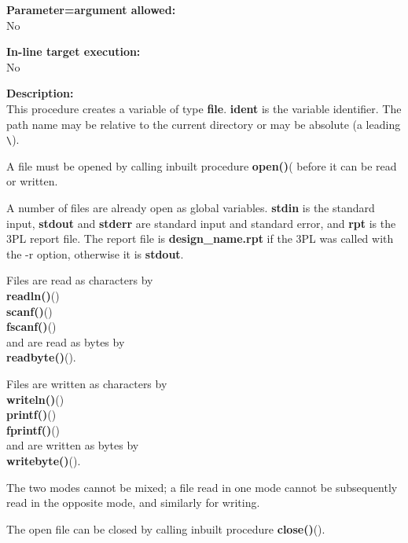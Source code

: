         {\bf Parameter=argument allowed:} \\
        No
        
        {\bf In-line target execution:} \\
        No
        
        {\bf Description:} \\
        This procedure creates a variable of type {\bf file}. {\bf ident} is
        the variable identifier. The path name may be relative to the current
        directory or may be absolute (a leading \verb'\').
        
        A file must be opened by calling inbuilt procedure
        {\bf open()}( before it can be read or written.
        
        A number of files are already open as global variables. {\bf stdin} is the
        standard input, {\bf stdout} and {\bf stderr} are standard input and standard error,
        and {\bf rpt} is the 3PL report file. The report file is {\bf design\_name.rpt} if
        the 3PL was called with the -r option, otherwise it is {\bf stdout}.
        
        Files are read as characters by \\
        {\bf readln()}() \\
        {\bf scanf()}() \\
        {\bf fscanf()}() \\   
        and are read as bytes by \\
        {\bf readbyte()}().
        
        Files are written as characters by \\
        {\bf writeln()}() \\
        {\bf printf()}() \\
        {\bf fprintf()}() \\
        and are written as bytes by \\
        {\bf writebyte()}().
        
        The two modes cannot be mixed; a file read in
        one mode cannot be subsequently read in the opposite mode, and similarly
        for writing.
        
        The open file can be closed by calling inbuilt procedure
        {\bf close()}().

